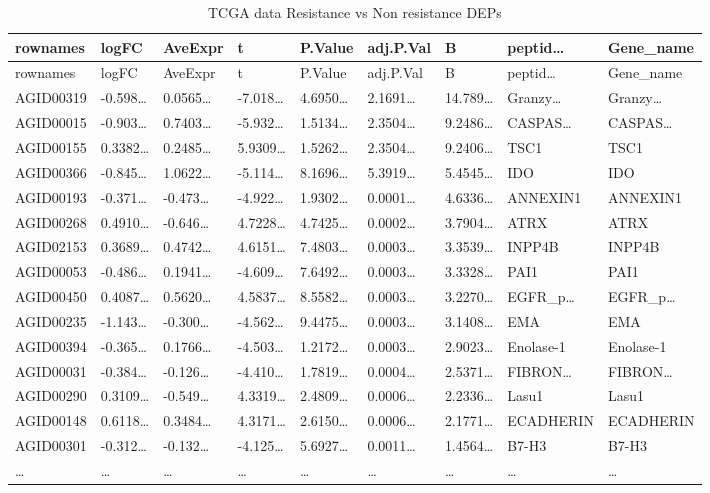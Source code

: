 \documentclass[
]{article}
\begin{document}
\begin{longtable}[]{@{}lllllllll@{}}
\caption{\label{tab:TCGA-data-Resistance-vs-Non-resistance-DEPs}TCGA data Resistance vs Non resistance DEPs}\tabularnewline
\toprule
rownames & logFC & AveExpr & t & P.Value & adj.P.Val & B & peptid\ldots{} & Gene\_name\tabularnewline
\midrule
\endfirsthead
\toprule
rownames & logFC & AveExpr & t & P.Value & adj.P.Val & B & peptid\ldots{} & Gene\_name\tabularnewline
\midrule
\endhead
AGID00319 & -0.598\ldots{} & 0.0565\ldots{} & -7.018\ldots{} & 4.6950\ldots{} & 2.1691\ldots{} & 14.789\ldots{} & Granzy\ldots{} & Granzy\ldots{}\tabularnewline
AGID00015 & -0.903\ldots{} & 0.7403\ldots{} & -5.932\ldots{} & 1.5134\ldots{} & 2.3504\ldots{} & 9.2486\ldots{} & CASPAS\ldots{} & CASPAS\ldots{}\tabularnewline
AGID00155 & 0.3382\ldots{} & 0.2485\ldots{} & 5.9309\ldots{} & 1.5262\ldots{} & 2.3504\ldots{} & 9.2406\ldots{} & TSC1 & TSC1\tabularnewline
AGID00366 & -0.845\ldots{} & 1.0622\ldots{} & -5.114\ldots{} & 8.1696\ldots{} & 5.3919\ldots{} & 5.4545\ldots{} & IDO & IDO\tabularnewline
AGID00193 & -0.371\ldots{} & -0.473\ldots{} & -4.922\ldots{} & 1.9302\ldots{} & 0.0001\ldots{} & 4.6336\ldots{} & ANNEXIN1 & ANNEXIN1\tabularnewline
AGID00268 & 0.4910\ldots{} & -0.646\ldots{} & 4.7228\ldots{} & 4.7425\ldots{} & 0.0002\ldots{} & 3.7904\ldots{} & ATRX & ATRX\tabularnewline
AGID02153 & 0.3689\ldots{} & 0.4742\ldots{} & 4.6151\ldots{} & 7.4803\ldots{} & 0.0003\ldots{} & 3.3539\ldots{} & INPP4B & INPP4B\tabularnewline
AGID00053 & -0.486\ldots{} & 0.1941\ldots{} & -4.609\ldots{} & 7.6492\ldots{} & 0.0003\ldots{} & 3.3328\ldots{} & PAI1 & PAI1\tabularnewline
AGID00450 & 0.4087\ldots{} & 0.5620\ldots{} & 4.5837\ldots{} & 8.5582\ldots{} & 0.0003\ldots{} & 3.2270\ldots{} & EGFR\_p\ldots{} & EGFR\_p\ldots{}\tabularnewline
AGID00235 & -1.143\ldots{} & -0.300\ldots{} & -4.562\ldots{} & 9.4475\ldots{} & 0.0003\ldots{} & 3.1408\ldots{} & EMA & EMA\tabularnewline
AGID00394 & -0.365\ldots{} & 0.1766\ldots{} & -4.503\ldots{} & 1.2172\ldots{} & 0.0003\ldots{} & 2.9023\ldots{} & Enolase-1 & Enolase-1\tabularnewline
AGID00031 & -0.384\ldots{} & -0.126\ldots{} & -4.410\ldots{} & 1.7819\ldots{} & 0.0004\ldots{} & 2.5371\ldots{} & FIBRON\ldots{} & FIBRON\ldots{}\tabularnewline
AGID00290 & 0.3109\ldots{} & -0.549\ldots{} & 4.3319\ldots{} & 2.4809\ldots{} & 0.0006\ldots{} & 2.2336\ldots{} & Lasu1 & Lasu1\tabularnewline
AGID00148 & 0.6118\ldots{} & 0.3484\ldots{} & 4.3171\ldots{} & 2.6150\ldots{} & 0.0006\ldots{} & 2.1771\ldots{} & ECADHERIN & ECADHERIN\tabularnewline
AGID00301 & -0.312\ldots{} & -0.132\ldots{} & -4.125\ldots{} & 5.6927\ldots{} & 0.0011\ldots{} & 1.4564\ldots{} & B7-H3 & B7-H3\tabularnewline
\ldots{} & \ldots{} & \ldots{} & \ldots{} & \ldots{} & \ldots{} & \ldots{} & \ldots{} & \ldots{}\tabularnewline
\bottomrule
\end{longtable}
\end{document}
